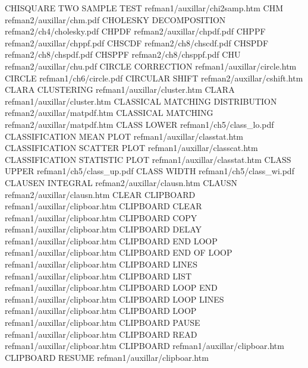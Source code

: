 CHISQUARE TWO SAMPLE TEST               refman1/auxillar/chi2samp.htm
CHM                                     refman2/auxillar/chm.pdf
CHOLESKY DECOMPOSITION                  refman2/ch4/cholesky.pdf
CHPDF                                   refman2/auxillar/chpdf.pdf
CHPPF                                   refman2/auxillar/chppf.pdf
CHSCDF                                  refman2/ch8/chscdf.pdf
CHSPDF                                  refman2/ch8/chspdf.pdf
CHSPPF                                  refman2/ch8/chsppf.pdf
CHU                                     refman2/auxillar/chu.pdf
CIRCLE CORRECTION                       refman1/auxillar/circle.htm
CIRCLE                                  refman1/ch6/circle.pdf
CIRCULAR SHIFT                          refman2/auxillar/cshift.htm
CLARA CLUSTERING                        refman1/auxillar/cluster.htm
CLARA                                   refman1/auxillar/cluster.htm
CLASSICAL MATCHING DISTRIBUTION         refman2/auxillar/matpdf.htm
CLASSICAL MATCHING                      refman2/auxillar/matpdf.htm
CLASS LOWER                             refman1/ch5/class_lo.pdf
CLASSIFICATION MEAN PLOT                refman1/auxillar/classtat.htm
CLASSIFICATION SCATTER PLOT             refman1/auxillar/classcat.htm
CLASSIFICATION STATISTIC PLOT           refman1/auxillar/classtat.htm
CLASS UPPER                             refman1/ch5/class_up.pdf
CLASS WIDTH                             refman1/ch5/class_wi.pdf
CLAUSEN INTEGRAL                        refman2/auxillar/clausn.htm
CLAUSN                                  refman2/auxillar/clausn.htm
CLEAR CLIPBOARD                         refman1/auxillar/clipboar.htm
CLIPBOARD CLEAR                         refman1/auxillar/clipboar.htm
CLIPBOARD COPY                          refman1/auxillar/clipboar.htm
CLIPBOARD DELAY                         refman1/auxillar/clipboar.htm
CLIPBOARD END LOOP                      refman1/auxillar/clipboar.htm
CLIPBOARD END OF LOOP                   refman1/auxillar/clipboar.htm
CLIPBOARD LINES                         refman1/auxillar/clipboar.htm
CLIPBOARD LIST                          refman1/auxillar/clipboar.htm
CLIPBOARD LOOP END                      refman1/auxillar/clipboar.htm
CLIPBOARD LOOP LINES                    refman1/auxillar/clipboar.htm
CLIPBOARD LOOP                          refman1/auxillar/clipboar.htm
CLIPBOARD PAUSE                         refman1/auxillar/clipboar.htm
CLIPBOARD READ                          refman1/auxillar/clipboar.htm
CLIPBOARD                               refman1/auxillar/clipboar.htm
CLIPBOARD RESUME                        refman1/auxillar/clipboar.htm

